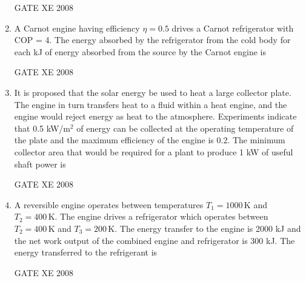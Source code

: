 \documentclass[12pt]{article}
\begin{document}
\begin{enumerate}[label=Q\arabic*.]
GATE XE 2008

\item  A Carnot engine having efficiency $\eta = 0.5$ drives a Carnot refrigerator with COP = 4. The energy absorbed by the refrigerator from the cold body for each kJ of energy absorbed from the source by the Carnot engine is  

\begin{enumerate}[label=(\Alph*)]
\end{enumerate}

GATE XE 2008

\item  It is proposed that the solar energy be used to heat a large collector plate. The engine in turn transfers heat to a fluid within a heat engine, and the engine would reject energy as heat to the atmosphere. Experiments indicate that 0.5 kW/m$^2$ of energy can be collected at the operating temperature of the plate and the maximum efficiency of the engine is 0.2. The minimum collector area that would be required for a plant to produce 1 kW of useful shaft power is  

\begin{enumerate}[label=(\Alph*)]
\end{enumerate}

GATE XE 2008

\item  A reversible engine operates between temperatures $T_1 = 1000 \, \mathrm{K}$ and $T_2 = 400 \, \mathrm{K}$. The engine drives a refrigerator which operates between $T_2 = 400 \, \mathrm{K}$ and $T_3 = 200 \, \mathrm{K}$. The energy transfer to the engine is 2000 kJ and the net work output of the combined engine and refrigerator is 300 kJ. The energy transferred to the refrigerant is  

\begin{enumerate}[label=(\Alph*)]
\end{enumerate}
GATE XE 2008


\end{enumerate}
\end{document}
